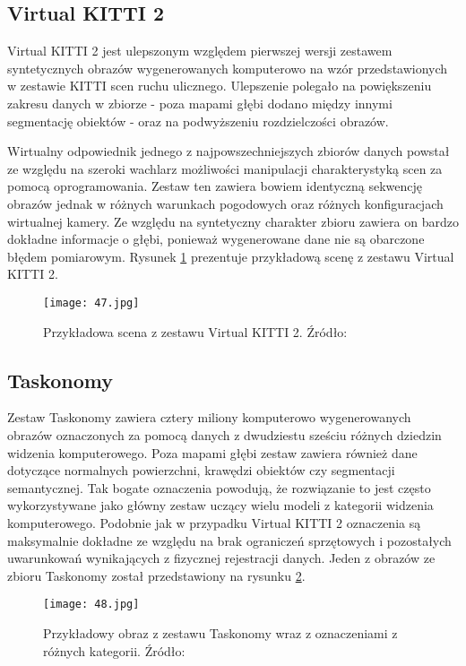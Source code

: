\subsection{Virtual KITTI 2}
Virtual KITTI 2 \cite{cabon2020virtualkitti2} jest ulepszonym względem pierwszej wersji zestawem syntetycznych obrazów wygenerowanych komputerowo na wzór przedstawionych w zestawie KITTI \cite{geiger2012} scen ruchu ulicznego. Ulepszenie polegało na powiększeniu zakresu danych w zbiorze - poza mapami głębi dodano między innymi segmentację obiektów - oraz na podwyższeniu rozdzielczości obrazów.

Wirtualny odpowiednik jednego z najpowszechniejszych zbiorów danych powstał ze względu na szeroki wachlarz możliwości manipulacji charakterystyką scen za pomocą oprogramowania. Zestaw ten zawiera bowiem identyczną sekwencję obrazów jednak w różnych warunkach pogodowych oraz różnych konfiguracjach wirtualnej kamery. Ze względu na syntetyczny charakter zbioru zawiera on bardzo dokładne informacje o głębi, ponieważ wygenerowane dane nie są obarczone błędem pomiarowym.
Rysunek \ref{fig:vkitti-example} prezentuje przykładową scenę z zestawu Virtual KITTI 2.
\begin{figure}[H]
    \centering
    \texttt{[image: 47.jpg]}
    \caption{Przykładowa scena z zestawu Virtual KITTI 2. Źródło: \cite{cabon2020virtualkitti2}}
    \label{fig:vkitti-example}
\end{figure}

\subsection{Taskonomy}
Zestaw Taskonomy \cite{zamir2018taskonomydisentanglingtasktransfer} zawiera cztery miliony komputerowo wygenerowanych obrazów oznaczonych za pomocą danych z dwudziestu sześciu różnych dziedzin widzenia komputerowego. Poza mapami głębi zestaw zawiera również dane dotyczące normalnych powierzchni, krawędzi obiektów czy segmentacji semantycznej. Tak bogate oznaczenia powodują, że rozwiązanie to jest często wykorzystywane jako główny zestaw uczący wielu modeli z kategorii widzenia komputerowego. Podobnie jak w przypadku Virtual KITTI 2 oznaczenia są maksymalnie dokładne ze względu na brak ograniczeń sprzętowych i pozostałych uwarunkowań wynikających z fizycznej rejestracji danych. Jeden z obrazów ze zbioru Taskonomy został przedstawiony na rysunku \ref{fig:taskonomy-example}.

\begin{figure}[H]
    \centering
    \texttt{[image: 48.jpg]}
    \caption{Przykładowy obraz z zestawu Taskonomy wraz z oznaczeniami z różnych kategorii. Źródło: \cite{zamir2018taskonomydisentanglingtasktransfer}}
    \label{fig:taskonomy-example}
\end{figure}

